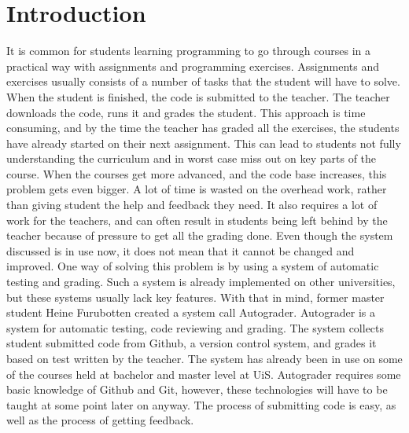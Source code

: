 \chapter*{Introduction}

It is common for students learning programming to go through courses in a practical way with assignments and programming exercises. Assignments and exercises usually consists of a number of tasks that the student will have to solve. When the student is finished, the code is submitted to the teacher. The teacher downloads the code, runs it and grades the student. This approach is time consuming, and by the time the teacher has graded all the exercises, the students have already started on their next assignment. This can lead to students not fully understanding the curriculum and in worst case miss out on key parts of the course. When the courses get more advanced, and the code base increases, this problem gets even bigger. A lot of time is wasted on the overhead work, rather than giving student the help and feedback they need. It also requires a lot of work for the teachers, and can often result in students being left behind by the teacher because of pressure to get all the grading done. Even though the system discussed is in use now, it does not mean that it cannot be changed and improved. One way of solving this problem is by using a system of automatic testing and grading. Such a system is already implemented on other universities, but these systems usually lack key features. With that in mind, former master student Heine Furubotten created a system call Autograder. Autograder is a system for automatic testing, code reviewing and grading. The system collects student submitted code from Github, a version control system, and grades it based on test written by the teacher. The system has already been in use on some of the courses held at bachelor and master level at UiS. Autograder requires some basic knowledge of Github and Git, however, these technologies will have to be taught at some point later on anyway. The process of submitting code is easy, as well as the process of getting feedback.

